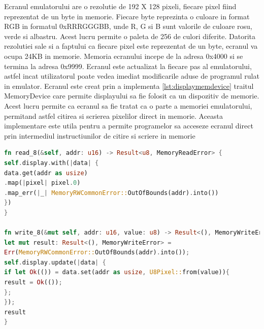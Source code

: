 \documentclass[titlepage,12pt]{article}
\DeclareRobustCommand{\code}[1]{{\ttfamily\small #1}}
\begin{document}
Ecranul emulatorului are o rezolutie de \code{192 X 128} pixeli, fiecare pixel fiind reprezentat de un byte in memorie. Fiecare byte reprezinta o culoare in format RGB in formatul \code{0xRRRGGGBB}, unde R, G si B sunt valorile de culoare rosu, verde si albastru. Acest lucru permite o paleta de 256 de culori diferite. Datorita rezolutiei sale si a faptului ca fiecare pixel este reprezentat de un byte, ecranul va ocupa 24KB in memorie. Memoria ecranului incepe de la adresa \code{0x4000} si se termina la adresa \code{0x9999}. Ecranul este actualizat la fiecare pas al emulatorului, astfel incat utilizatorul poate vedea imediat modificarile aduse de programul rulat in emulator.
Ecranul este creat prin a implementa \cref{lst:displaymemdevice} traitul \code{MemoryDevice} care permite displayului sa fie folosit ca un dispozitiv de memorie. Acest lucru permite ca ecranul sa fie tratat ca o parte a memoriei emulatorului, permitand astfel citirea si scrierea pixelilor direct in memorie. Aceasta implementare este utila pentru a permite programelor sa acceseze ecranul direct prin intermediul instructiunilor de citire si scriere in memorie



\begin{lstlisting}[language=Rust,caption={Implementare \code{MemoryDevice} display},label={lst:displaymemdevice}]
fn read_8(&self, addr: u16) -> Result<u8, MemoryReadError> {
self.display.with(|data| {
data.get(addr as usize)
.map(|pixel| pixel.0)
.map_err(|_| MemoryRWCommonError::OutOfBounds(addr).into())
})
}

fn write_8(&mut self, addr: u16, value: u8) -> Result<(), MemoryWriteError> {
let mut result: Result<(), MemoryWriteError> =
Err(MemoryRWCommonError::OutOfBounds(addr).into());
self.display.update(|data| {
if let Ok(()) = data.set(addr as usize, U8Pixel::from(value)){
result = Ok(());
};
});
result
}
\end{lstlisting}
\end{document}

